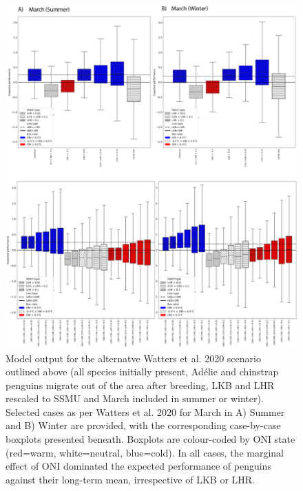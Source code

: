 \documentclass[]{elsarticle} %
\begin{document}
\begin{figure}

\includegraphics[width=1\linewidth]{./Watters EMM figures/All spp summer then winter 37} \hfill{}

\caption{Model output for the alternatve Watters et al. 2020 scenario outlined above (all species initially present, Adélie and chinstrap penguins migrate out of the area after breeding, LKB and LHR rescaled to SSMU and March included in summer or winter).   Selected cases as per Watters et al. 2020 for March in A) Summer and B) Winter are provided, with the corresponding case-by-case boxplots presented beneath.  Boxplots are colour-coded by ONI state (red=warm, white=neutral, blue=cold).  In all cases, the marginal effect of ONI dominated the expected performance of penguins against their long-term mean, irrespective of LKB or LHR.}\label{fig:Scenario plot 1}
\end{figure}
\end{document}
